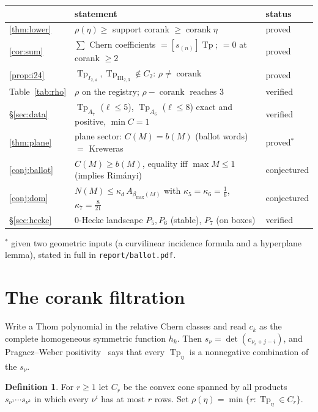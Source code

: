 \documentclass[11pt,a4paper]{article}
\DeclareMathOperator{\Tp}{Tp}
\theoremstyle{plain}
\theoremstyle{definition}
\newtheorem{definition}[theorem]{Definition}
\theoremstyle{remark}
\begin{document}
\begin{center}\small
\begin{tabular}{@{}lll@{}}
\toprule
& statement & status \\
\midrule
\ref{thm:lower} & $\rho(\eta) \ge$ support corank $\ge \operatorname{corank} \eta$ & proved \\
\ref{cor:sum} & $\sum$ Chern coefficients $= [s_{(n)}]\Tp$; $=0$ at corank $\ge 2$ & proved \\
\ref{prop:i24} & $\Tp_{I_{2,4}}, \Tp_{\mathrm{III}_{2,3}} \notin C_2$: $\rho \ne \operatorname{corank}$ & proved \\
Table~\ref{tab:rho} & $\rho$ on the registry; $\rho - \operatorname{corank}$ reaches $3$ & verified \\
\S\ref{sec:data} & $\Tp_{A_7}$ ($\ell \le 5$), $\Tp_{A_6}$ ($\ell \le 8$) exact and positive, $\min C = 1$ & verified \\
\ref{thm:plane} & plane sector: $C(M) = b(M)$ (ballot words) $=$ Kreweras & proved$^*$ \\
\ref{conj:ballot} & $C(M) \ge b(M)$, equality iff $\max M \le 1$ (implies Rim\'anyi) & conjectured \\
\ref{conj:dom} & $N(M) \le \kappa_d\, A_{\beta_{\max}(M)}$ with $\kappa_5 = \kappa_6 = \tfrac16$, $\kappa_7 = \tfrac{8}{21}$ & conjectured \\
\S\ref{sec:hecke} & 0-Hecke landscape $P_5, P_6$ (stable), $P_7$ (on boxes) & verified \\
\bottomrule
\end{tabular}

{\footnotesize $^*$ given two geometric inputs (a curvilinear incidence formula and a hyperplane lemma), stated in full in \texttt{report/ballot.pdf}.}
\end{center}

\section{The corank filtration}\label{sec:corank}

Write a Thom polynomial in the relative Chern classes and read $c_k$ as the complete homogeneous
symmetric function $h_k$. Then $s_\nu = \det(c_{\nu_i + j - i})$, and Pragacz--Weber
positivity~\cite{PW07} says that every $\Tp_\eta$ is a nonnegative combination of the $s_\nu$.

\begin{definition}
For $r \ge 1$ let $C_r$ be the convex cone spanned by all products $s_{\nu^1} \cdots s_{\nu^k}$ in
which every $\nu^i$ has at most $r$ rows. Set $\rho(\eta) = \min\{r : \Tp_\eta \in C_r\}$.
\end{definition}
\end{document}
